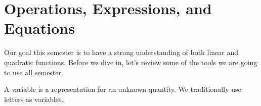 \chapter{Operations, Expressions, and Equations}






















Our goal this semester is to have a strong understanding of both linear and quadratic functions. Before we dive in, let's review some of the tools we are going to use all semester. 
\begin{presentation}
\begin{defn}[Variable]
	A variable is a representation for an unknown quantity. We traditionally use letters as variables. 
\end{defn}
\end{presentation}

